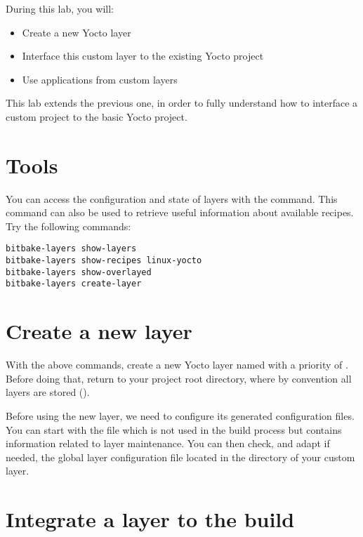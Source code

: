 
During this lab, you will:
\begin{itemize}
  \item Create a new Yocto layer
  \item Interface this custom layer to the existing Yocto project
  \item Use applications from custom layers
\end{itemize}

This lab extends the previous one, in order to fully understand how to interface
a custom project to the basic Yocto project.

\section{Tools}

You can access the configuration and state of layers with the
 command. This command can also be used to retrieve useful
information about available recipes. Try the following commands:
\begin{verbatim}
bitbake-layers show-layers
bitbake-layers show-recipes linux-yocto
bitbake-layers show-overlayed
bitbake-layers create-layer
\end{verbatim}

\section{Create a new layer}

With the above commands, create a new Yocto layer named
 with a priority of . Before doing that,
return to your project root directory, where by convention all layers are
stored ().

Before using the new layer, we need to configure its generated configuration
files. You can start with the  file which is not used in the build
process but contains information related to layer maintenance. You can then
check, and adapt if needed, the global layer configuration file located in the
 directory of your custom layer.

\section{Integrate a layer to the build}

